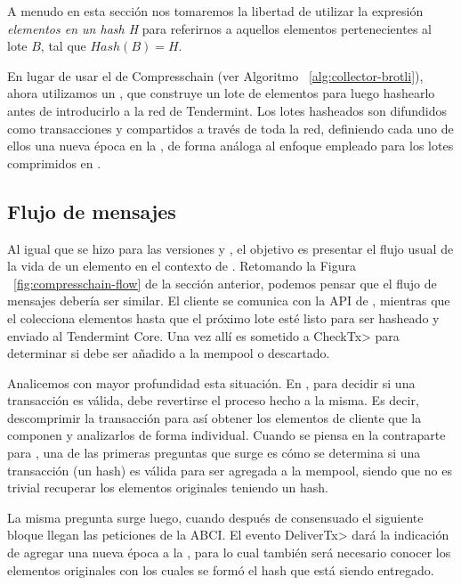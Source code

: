 A menudo en esta sección nos tomaremos la libertad de utilizar la expresión \textit{elementos en un hash H}
para referirnos a aquellos elementos pertenecientes al lote $B$, tal que $Hash(B) = H$.

En lugar de usar el \collector de Compresschain (ver Algoritmo ~\ref{alg:collector-brotli}),
ahora utilizamos un \hcollector, que construye un lote de elementos para luego hashearlo
antes de introducirlo a la red de Tendermint.
%
Los lotes hasheados son difundidos como transacciones y compartidos a través de toda la red, definiendo cada
uno de ellos una nueva época en la \setchain, de forma
análoga al enfoque empleado para los lotes comprimidos en \compresschain.

\subsection{Flujo de mensajes}

Al igual que se hizo para las versiones \vanilla y \compresschain, el objetivo es presentar el flujo usual
de la vida de un elemento en el contexto de \hashchain.
%
Retomando la Figura ~\ref{fig:compresschain-flow} de la sección anterior, podemos pensar que el flujo de mensajes
debería ser similar. El cliente se comunica con la API de \setchain, mientras que el \hcollector colecciona elementos
hasta que el próximo lote esté listo para ser hasheado y enviado al Tendermint Core.
Una vez allí es sometido a
\<CheckTx> para determinar si debe ser añadido a la mempool o descartado.

Analicemos con mayor profundidad esta situación. En \compresschain, para decidir si una
transacción es válida, debe revertirse el proceso hecho a la misma.
Es decir, descomprimir la transacción para
así obtener los elementos de cliente que la componen y analizarlos de forma individual.
Cuando se piensa en la contraparte para \hashchain, una de las primeras preguntas que surge es cómo se determina si una
transacción (un hash) es válida para ser agregada a la mempool, siendo que no es trivial recuperar los
elementos originales teniendo un hash.

%

La misma pregunta surge luego,
cuando después de consensuado el siguiente bloque llegan las peticiones de la ABCI.
%
El evento \<DeliverTx> dará la indicación de agregar una nueva época a la \setchain, para lo cual también
será necesario conocer los elementos originales con los cuales se formó el hash que está siendo entregado.

